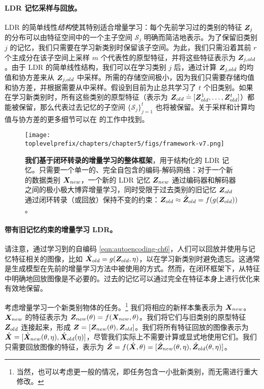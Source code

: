 \documentclass[../../book-main_zh.tex]{subfiles}
\begin{document}
\paragraph{LDR 记忆采样与回放。} LDR 的简单线性{\em 结构}使其特别适合增量学习：每个先前学习过的类别的特征 $\bm{Z}_j$ 的分布可以由特征空间中的一个主子空间 $\mathcal{S}_j$ 明确而简洁地表示。为了保留旧类别 $j$ 的记忆，我们只需要在学习新类别时保留该子空间。为此，我们只需沿着其前 $r$ 个主成分在该子空间上采样 $m$ 个代表性的原型特征，并将这些特征表示为 $\bm{Z}_{j,old}$。由于 LDR 的简单线性结构，我们可以在学习类别 $j$ 后，通过计算 $\bm{Z}_{j,old}$ 的均值和协方差来从 $\bm{Z}_{j,old}$ 中采样。所需的存储空间极小，因为我们只需要存储均值和协方差，并根据需要从中采样。假设到目前为止总共学习了 $t$ 个旧类别。如果在学习新类别时，所有这些类别的原型特征（表示为 $\bm{Z}_{old} \doteq [\bm{Z}^1_{old},\ldots, \bm{Z}^t_{old}]$）都能被保留，那么代表过去记忆的子空间 $\{\mathcal{S}_j\}_{j=1}^t$ 也将被保留。关于采样和计算均值与协方差的更多细节可以在 \cite{tong2023incremental} 的工作中找到。

\begin{figure*}[t]
\centering
\texttt{[image: \\toplevelprefix/chapters/chapter5/figs/framework-v7.png]}
\caption{\textbf{我们基于闭环转录的增量学习的整体框架}，用于结构化的 LDR 记忆。只需要一个单一的、完全自包含的编码-解码网络：对于一个新的数据类别 $\bm{X}_{new}$，一个新的 LDR 记忆 $\bm{Z}_{new}$ 通过编码器和解码器之间的极小极大博弈增量学习，同时受限于过去类别的旧记忆 $\bm{Z}_{old}$ 通过闭环转录（或回放）保持不变的约束：$\bm{Z}_{old} \approx \hat{\bm{Z}}_{old} = f(g(\bm{Z}_{old}))$。
\vspace{-0.2in}}
\label{fig:framework}
\end{figure*}

\paragraph{带有旧记忆约束的增量学习 LDR。} 
请注意，通过学习到的自编码 \eqref{eqn:autoencoding-ch6}，人们可以回放并使用与记忆特征相关的图像，比如 $\hat{\bm{X}}_{old} = g(\bm{Z}_{old}, \eta)$，以在学习新类别时避免遗忘。这通常是生成模型在先前的增量学习方法中被使用的方式。然而，在闭环框架下，从特征中明确地回放图像是不必要的。过去的记忆可以通过完全在特征本身上进行优化来有效地保留。

考虑增量学习一个新类别物体的任务。\footnote{当然，也可以考虑更一般的情况，即任务包含一小批新类别，而无需进行重大修改。} 我们将相应的新样本集表示为 $\bm{X}_{new}$。$\bm{X}_{new}$ 的特征表示为 $\bm{Z}_{new}(\theta) = f(\bm{X}_{new}, \theta)$。我们将它们与旧类别的原型特征 $\bm{Z}_{old}$ 连接起来，形成 $\bm{Z} = [\bm{Z}_{new}(\theta), \bm{Z}_{old}]$。我们将所有特征回放的图像表示为 $\hat{\bm{X}} = [{\hat{\bm{X}}_{new}(\theta,\eta)}, {\hat{\bm{X}}_{old}(\eta)}]$，尽管我们实际上不需要计算或显式地使用它们。我们只需要回放图像的特征，表示为 $\hat{\bm{Z}} = f(\hat{\bm{X}}, \theta) =  [{\hat{\bm{Z}}_{new}(\theta,\eta)}, {\hat{\bm{Z}}_{old}(\theta,\eta)}]$。
\end{document}
